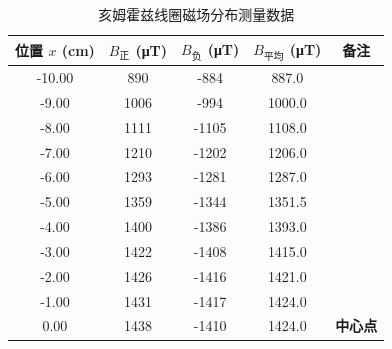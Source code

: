 \documentclass{../template/Report}%
\begin{document}
\begin{fullreportonly}
    \begin{table}[H]
        \centering
        \caption{亥姆霍兹线圈磁场分布测量数据}
        \label{tab:hmhz}
        \small
        \begin{tabular}{c c c c c}
            \toprule
            \textbf{位置} $x$ (\si{cm}) & $B_{\text{正}}$ (\si{\micro\tesla}) & $B_{\text{负}}$ (\si{\micro\tesla}) & $B_{\text{平均}}$ (\si{\micro\tesla}) & \textbf{备注}  \\
            \midrule
            -10.00                    & 890                                & -884                               & 887.0                               &              \\
            -9.00                     & 1006                               & -994                               & 1000.0                              &              \\
            -8.00                     & 1111                               & -1105                              & 1108.0                              &              \\
            -7.00                     & 1210                               & -1202                              & 1206.0                              &              \\
            -6.00                     & 1293                               & -1281                              & 1287.0                              &              \\
            -5.00                     & 1359                               & -1344                              & 1351.5                              &              \\
            -4.00                     & 1400                               & -1386                              & 1393.0                              &              \\
            -3.00                     & 1422                               & -1408                              & 1415.0                              &              \\
            -2.00                     & 1426                               & -1416                              & 1421.0                              &              \\
            -1.00                     & 1431                               & -1417                              & 1424.0                              &              \\
            0.00                      & 1438                               & -1410                              & 1424.0                              & \textbf{中心点} \\

\end{tabular}
\end{table}
\end{fullreportonly}
\end{document}
